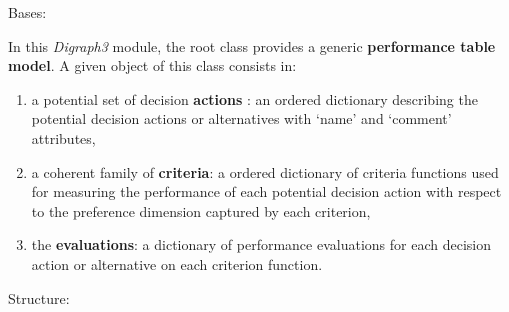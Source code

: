 \documentclass[letterpaper,10pt,english]{sphinxmanual}
\begin{document}
\begin{fulllineitems}
\label{techDoc:perfTabs.PerformanceTableau}
Bases: \href{http://docs.python.org/library/functions.html\#object}{}

In this \emph{Digraph3} module, the root {\hyperref[techDoc:perfTabs.PerformanceTableau]{\emph{}}} class provides a generic \textbf{performance table model}. A given object of this class consists in:
\begin{enumerate}
\item {} 
a potential set of decision \textbf{actions} : an ordered dictionary describing the potential decision actions or alternatives with `name' and `comment' attributes,

\item {} 
a coherent family of \textbf{criteria}: a ordered dictionary of criteria functions used for measuring the performance of each potential decision action with respect to the preference dimension captured by each criterion,

\item {} 
the \textbf{evaluations}: a dictionary of performance evaluations for each decision action or alternative on each criterion function.

\end{enumerate}

Structure:


\end{fulllineitems}
\end{document}
